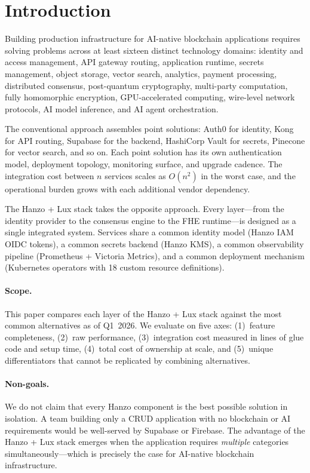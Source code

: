 \section{Introduction}

\label{sec:intro}

Building production infrastructure for AI-native blockchain applications requires solving problems across at least sixteen distinct technology domains: identity and access management, API gateway routing, application runtime, secrets management, object storage, vector search, analytics, payment processing, distributed consensus, post-quantum cryptography, multi-party computation, fully homomorphic encryption, GPU-accelerated computing, wire-level network protocols, AI model inference, and AI agent orchestration.

The conventional approach assembles point solutions: Auth0 for identity, Kong for API routing, Supabase for the backend, HashiCorp Vault for secrets, Pinecone for vector search, and so on. Each point solution has its own authentication model, deployment topology, monitoring surface, and upgrade cadence. The integration cost between $n$ services scales as $O(n^2)$ in the worst case, and the operational burden grows with each additional vendor dependency.

The Hanzo + Lux stack takes the opposite approach. Every layer---from the identity provider to the consensus engine to the FHE runtime---is designed as a single integrated system. Services share a common identity model (Hanzo IAM OIDC tokens), a common secrets backend (Hanzo KMS), a common observability pipeline (Prometheus + Victoria Metrics), and a common deployment mechanism (Kubernetes operators with 18 custom resource definitions).

\paragraph{Scope.} This paper compares each layer of the Hanzo + Lux stack against the most common alternatives as of Q1~2026. We evaluate on five axes: (1)~feature completeness, (2)~raw performance, (3)~integration cost measured in lines of glue code and setup time, (4)~total cost of ownership at scale, and (5)~unique differentiators that cannot be replicated by combining alternatives.

\paragraph{Non-goals.} We do not claim that every Hanzo component is the best possible solution in isolation. A team building only a CRUD application with no blockchain or AI requirements would be well-served by Supabase or Firebase. The advantage of the Hanzo + Lux stack emerges when the application requires \textit{multiple} categories simultaneously---which is precisely the case for AI-native blockchain infrastructure.

